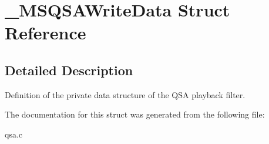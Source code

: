 \section{\-\_\-\-M\-S\-Q\-S\-A\-Write\-Data Struct Reference}
\label{struct__MSQSAWriteData}


\subsection{Detailed Description}
Definition of the private data structure of the Q\-S\-A playback filter. 

The documentation for this struct was generated from the following file\-:\begin{DoxyCompactItemize}
\item 
qsa.\-c\end{DoxyCompactItemize}
